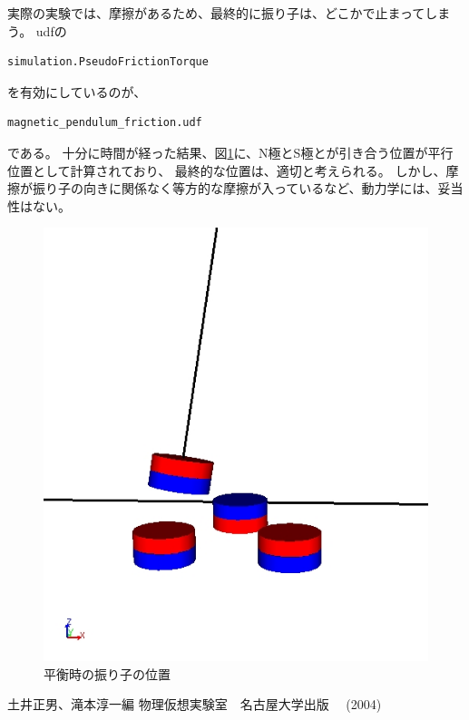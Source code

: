 \documentclass[a4paper,11pt]{jarticle}
\begin{document}
実際の実験では、摩擦があるため、最終的に振り子は、どこかで止まってしまう。
udfの
\begin{verbatim}
simulation.PseudoFrictionTorque
\end{verbatim}
を有効にしているのが、
\begin{verbatim}
magnetic_pendulum_friction.udf
\end{verbatim}
である。
十分に時間が経った結果、図\ref{fig:pendulum_equlibrium}に、N極とS極とが引き合う位置が平行位置として計算されており、
最終的な位置は、適切と考えられる。
しかし、摩擦が振り子の向きに関係なく等方的な摩擦が入っているなど、動力学には、妥当性はない。
\begin{figure}[h]
\centering
  \includegraphics[clip,width=0.6\linewidth]{pendulum_equlibrium.jpg}
  \caption{平衡時の振り子の位置
  }
  \label{fig:pendulum_equlibrium}
\end{figure}

\begin{thebibliography}{9}
  土井正男、滝本淳一編   物理仮想実験室　名古屋大学出版 　(2004)
\end{thebibliography}
\end{document}
